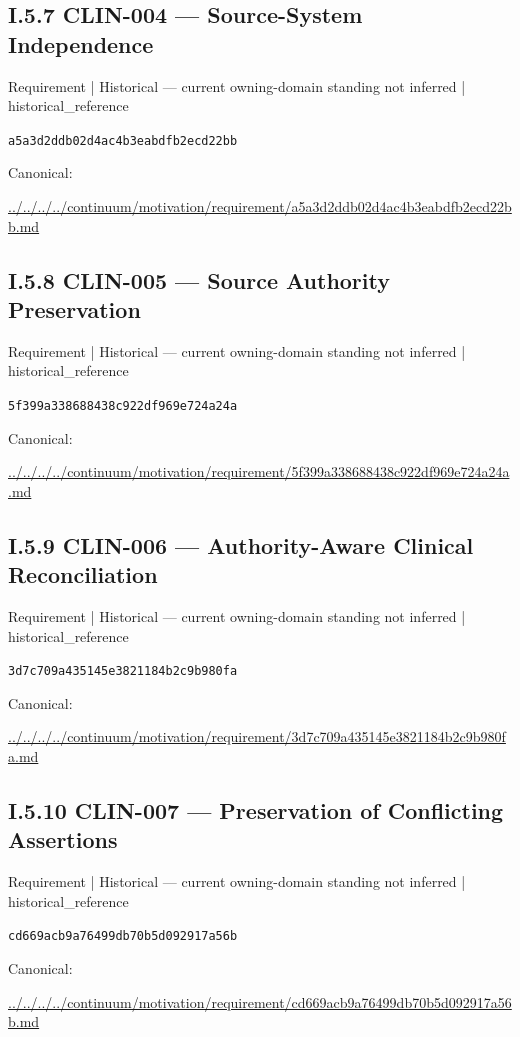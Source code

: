 \documentclass[10pt,a4paper]{article}
\begin{document}
\subsection*{I.5.7 CLIN-004 — Source-System Independence}
{\small Requirement | Historical — current owning-domain standing not inferred | historical\_reference}\par
\texttt{a5a3d2ddb02d4ac4b3eabdfb2ecd22bb}\par
Canonical: \par
{\footnotesize\url{../../../../continuum/motivation/requirement/a5a3d2ddb02d4ac4b3eabdfb2ecd22bb.md}}\par
\subsection*{I.5.8 CLIN-005 — Source Authority Preservation}
{\small Requirement | Historical — current owning-domain standing not inferred | historical\_reference}\par
\texttt{5f399a338688438c922df969e724a24a}\par
Canonical: \par
{\footnotesize\url{../../../../continuum/motivation/requirement/5f399a338688438c922df969e724a24a.md}}\par
\subsection*{I.5.9 CLIN-006 — Authority-Aware Clinical Reconciliation}
{\small Requirement | Historical — current owning-domain standing not inferred | historical\_reference}\par
\texttt{3d7c709a435145e3821184b2c9b980fa}\par
Canonical: \par
{\footnotesize\url{../../../../continuum/motivation/requirement/3d7c709a435145e3821184b2c9b980fa.md}}\par
\subsection*{I.5.10 CLIN-007 — Preservation of Conflicting Assertions}
{\small Requirement | Historical — current owning-domain standing not inferred | historical\_reference}\par
\texttt{cd669acb9a76499db70b5d092917a56b}\par
Canonical: \par
{\footnotesize\url{../../../../continuum/motivation/requirement/cd669acb9a76499db70b5d092917a56b.md}}\par
\end{document}
